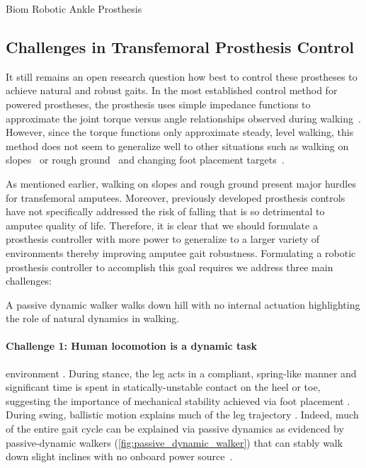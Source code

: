 \begin{marginfigure}[-1in]
    \centering
    \caption{Biom Robotic Ankle Prosthesis}
    \label{fig:biom_ankle}
\end{marginfigure}


\subsection{Challenges in Transfemoral Prosthesis Control}\label{sec:intro_challenges}
It still remains an open research question how best to control these prostheses
to achieve natural and robust gaits. In the most established control method for
powered prostheses, the prosthesis uses simple impedance functions to
approximate the joint torque versus angle relationships observed during
walking~\citep{sup2009preliminary}. However, since the torque functions only
approximate steady, level walking, this method does not seem to generalize well
to other situations such as walking on slopes~\citep{sup2011upslope} or rough
ground~\citep{thatte2016toward} and changing foot placement
targets~\citep{schepelmann2016evaluation}. 

As mentioned earlier, walking on slopes and rough ground present major hurdles
for transfemoral amputees. Moreover, previously developed prosthesis controls
have not specifically addressed the risk of falling that is so detrimental to
amputee quality of life. Therefore, it is clear that we should formulate a
prosthesis controller with more power to generalize to a larger variety of
environments thereby improving amputee gait robustness. Formulating a robotic
prosthesis controller to accomplish this goal requires we address three main
challenges:

\begin{marginfigure}
    \centering
    \caption{A passive dynamic walker walks down hill with no internal
    actuation highlighting the role of natural dynamics in walking.}
    \label{fig:passive_dynamic_walker}
\end{marginfigure}

\paragraph{Challenge 1: Human locomotion is a dynamic task}
environment \citep{mcgeer_1992}. During stance, the leg acts in a compliant,
spring-like manner \citep{geyer2006compliant} and significant time is spent
in statically-unstable contact on the heel or toe, suggesting the importance
of mechanical stability achieved via foot placement \citep{perry1992gait}.
During swing, ballistic motion explains much of the leg trajectory
\citep{mochon1980ballistic}. Indeed, much of the entire gait cycle can be
explained via passive dynamics as evidenced by passive-dynamic walkers
(\cref{fig:passive_dynamic_walker}) that can stably walk down slight
inclines with no onboard power source~\citep{mcgeer1990passive,
collins2005efficient}.

